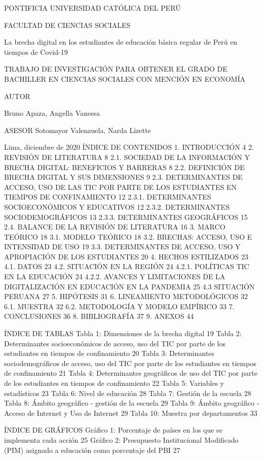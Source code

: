 PONTIFICIA UNIVERSIDAD CATÓLICA DEL PERÚ

FACULTAD DE CIENCIAS SOCIALES

La brecha digital en los estudiantes de educación básica regular de Perú
en tiempos de Covid-19

TRABAJO DE INVESTIGACIÓN PARA OBTENER EL GRADO DE BACHILLER EN CIENCIAS
SOCIALES CON MENCIÓN EN ECONOMÍA

AUTOR

Bruno Apaza, Angella Vanessa

ASESOR Sotomayor Valenzuela, Narda Lizette

Lima, diciembre de 2020 ÍNDICE DE CONTENIDOS 1. INTRODUCCIÓN 4 2.
REVISIÓN DE LITERATURA 8 2.1. SOCIEDAD DE LA INFORMACIÓN Y BRECHA
DIGITAL: BENEFICIOS Y BARRERAS 8 2.2. DEFINICIÓN DE BRECHA DIGITAL Y SUS
DIMENSIONES 9 2.3. DETERMINANTES DE ACCESO, USO DE LAS TIC POR PARTE DE
LOS ESTUDIANTES EN TIEMPOS DE CONFINAMIENTO 12 2.3.1. DETERMINANTES
SOCIOECONÓMICOS Y EDUCATIVOS 12 2.3.2. DETERMINANTES SOCIODEMOGRÁFICOS
13 2.3.3. DETERMINANTES GEOGRÁFICOS 15 2.4. BALANCE DE LA REVISIÓN DE
LITERATURA 16 3. MARCO TEÓRICO 18 3.1. MODELO TEÓRICO 18 3.2. BRECHAS:
ACCESO, USO E INTENSIDAD DE USO 19 3.3. DETERMINANTES DE ACCESO, USO Y
APROPIACIÓN DE LOS ESTUDIANTES 20 4. HECHOS ESTILIZADOS 23 4.1. DATOS 23
4.2. SITUACIÓN EN LA REGIÓN 24 4.2.1. POLÍTICAS TIC EN LA EDUCACIÓN 24
4.2.2. AVANCES Y LIMITACIONES DE LA DIGITALIZACIÓN EN EDUCACIÓN EN LA
PANDEMIA 25 4.3 SITUACIÓN PERUANA 27 5. HIPÓTESIS 31 6. LINEAMIENTO
METODOLÓGICOS 32 6.1. MUESTRA 32 6.2. METODOLOGÍA Y MODELO EMPÍRICO 33
7. CONCLUSIONES 36 8. BIBLIOGRAFÍA 37 9. ANEXOS 44

ÍNDICE DE TABLAS Tabla 1: Dimensiones de la brecha digital 19 Tabla 2:
Determinantes socioeconómicos de acceso, uso del TIC por parte de los
estudiantes en tiempos de confinamiento 20 Tabla 3: Determinantes
sociodemográficos de acceso, uso del TIC por parte de los estudiantes en
tiempos de confinamiento 21 Tabla 4: Determinantes geográficos de uso
del TIC por parte de los estudiantes en tiempos de confinamiento 22
Tabla 5: Variables y estadísticos 23 Tabla 6: Nivel de educación 28
Tabla 7: Gestión de la escuela 28 Tabla 8: Ámbito geográfico - gestión
de la escuela 29 Tabla 9: Ámbito geográfico - Acceso de Internet y Uso
de Internet 29 Tabla 10: Muestra por departamentos 33

ÍNDICE DE GRÁFICOS Gráfico 1: Porcentaje de países en los que se
implementa cada acción 25 Gráfico 2: Presupuesto Institucional
Modificado (PIM) asignado a educación como porcentaje del PBI 27


